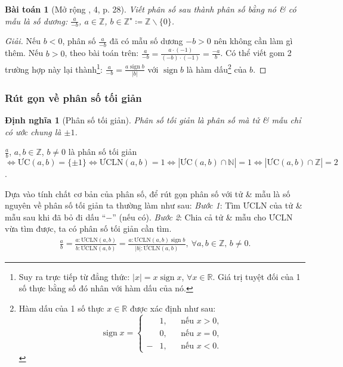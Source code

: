 \documentclass{article}
\newtheorem{baitoan}{Bài toán}
\newtheorem{dinhnghia}{Định nghĩa}
\begin{document}
\begin{baitoan}[Mở rộng \cite{SGK_Toan_6_Canh_Dieu_tap_2}, 4, p. 28]
	Viết phân số sau thành phân số bằng nó \& có mẫu là số dương: $\frac{a}{-b}$, $a\in\mathbb{Z}$, $b\in\mathbb{Z}^\star\coloneqq\mathbb{Z}\backslash\{0\}$.
\end{baitoan}

\begin{proof}[Giải]
	Nếu $b < 0$, phân số $\frac{a}{-b}$ đã có mẫu số dương $-b > 0$ nên không cần làm gì thêm. Nếu $b > 0$, theo bài toán trên: $\frac{a}{-b} = \frac{a\cdot(-1)}{(-b)\cdot(-1)} = \frac{-a}{b}$. Có thể viết gom 2 trường hợp này lại thành\footnote{Suy ra trực tiếp từ đẳng thức: $|x| = x\operatorname{sign}x$, $\forall x\in\mathbb{R}$. Giá trị tuyệt đối của 1 số thực bằng số đó nhân với hàm dấu của nó.}: $\frac{a}{-b} = \frac{a\operatorname{sign}b}{|b|}$ với $\operatorname{sign}b$ là hàm dấu\footnote{Hàm dấu của 1 số thực $x\in\mathbb{R}$ được xác định như sau:
	\begin{equation*}
		\operatorname{sign}x = \left\{\begin{split}
			&1,&&\mbox{nếu } x > 0,\\
			&0,&&\mbox{nếu } x = 0,\\
			-&1,&&\mbox{nếu } x < 0.
		\end{split}\right.
	\end{equation*}} của $b$.
\end{proof}

\subsubsection{Rút gọn về phân số tối giản}

\begin{dinhnghia}[Phân số tối giản]
	\emph{Phân số tối giản} là phân số mà tử \& mẫu chỉ có ước chung là $\pm1$.
\end{dinhnghia}
$\frac{a}{b}$, $a,b\in\mathbb{Z}$, $b\ne0$ là phân số tối giản $\Leftrightarrow\mbox{ƯC}(a,b) = \{\pm1\}\Leftrightarrow\mbox{ƯCLN}(a,b) = 1\Leftrightarrow|\mbox{ƯC}(a,b)\cap\mathbb{N}| = 1\Leftrightarrow|\mbox{ƯC}(a,b)\cap\mathbb{Z}| = 2$.

Dựa vào tính chất cơ bản của phân số, để rút gọn phân số với tử \& mẫu là số nguyên về phân số tối giản ta thường làm như sau: \textit{Bước 1}: Tìm ƯCLN của tử \& mẫu sau khi đã bỏ đi dấu ``$-$'' (nếu có). \textit{Bước 2}: Chia cả tử \& mẫu cho ƯCLN vừa tìm được, ta có phân số tối giản cần tìm.
\begin{align*}
	\frac{a}{b} = \frac{a:\mbox{ƯCLN}(a,b)}{b:\mbox{ƯCLN}(a,b)} = \frac{a:\mbox{ƯCLN}(a,b)\operatorname{sign}b}{|b|:\mbox{ƯCLN}(a,b)},\ \forall a,b\in\mathbb{Z},\,b\ne0.
\end{align*}
\end{document}
